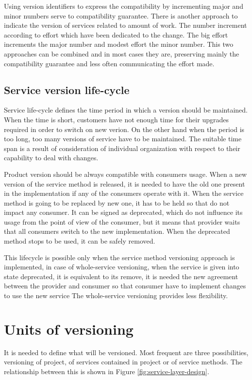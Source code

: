 Using version identifiers to express the compatibility by incrementing major and minor numbers serve to compatibility guarantee. There is another approach to indicate the version of services related to amount of work. The number increment according to effort which have been dedicated to the change. The big effort increments the major number and modest effort the minor number. This two approaches can be combined and in most cases they are, preserving mainly the compatibility guarantee and less often communicating the effort made. \cite{soa-governance}


\subsection{Service version life-cycle}
Service life-cycle defines the time period in which a version should be maintained. When the time is short, customers have not enough time for their upgrades required in order to switch on new verion. On the other hand when the period is too long, too many versions of service have to be maintained. The suitable time span is a result of consideration of individual organization with respect to their capability to deal with changes.

Product version should be always compatible with consumers usage. When a new version of the service method is released, it is needed to have the old one present in the implementation if any of the consumers operate with it. When the service method is going to be replaced by new one, it has to be held so that do not impact any consumer. It can be signed as deprecated, which do not influence its usage from the point of view of the consumer, but it means that provider waits that all consumers switch to the new implementation. When the deprecated method stops to be used, it can be safely removed. 

This lifecycle is possible only when the service method versioning approach is implemented, in case of whole-service versioning, when the service is given into state deprecated, it is equivalent to its remove, it is needed the new agreement between the provider and consumer so that consumer have to implement changes to use the new service %
The whole-service versioning provides less flexibility.

\section{Units of versioning}
It is needed to define what will be versioned. Most frequent are three possibilities, versioning of project, of services contained in project or of service methods. The relationship between this is shown in Figure \ref{fig:service-layer-design}.


